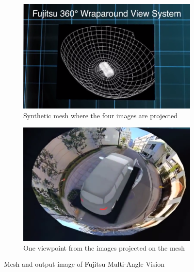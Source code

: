 \begin{figure}[h]
	\centering
	\begin{subfigure}[b]{0.48\textwidth}
		\includegraphics[width=\textwidth]{images/fujitsu-mesh-state}
		\caption{Synthetic mesh where the four images are projected}
		\label{fig:fujitsu-mesh-state}
	\end{subfigure}
	\hspace{0.2cm}
	\begin{subfigure}[b]{0.443\textwidth}
		\includegraphics[width=\textwidth]{images/fujitsu-360-state}
		\caption{One viewpoint from the images projected on the mesh}
		\label{fig:fujitsu-360-state}
	\end{subfigure}
	\caption{Mesh and output image of Fujitsu Multi-Angle Vision  \cite{fujitsu}}
	\label{fig:fujitsu-state}
\end{figure}

